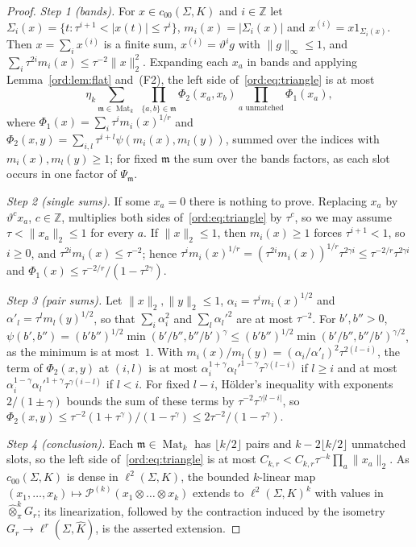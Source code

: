\documentclass[11pt]{amsart}
\theoremstyle{definition}
\theoremstyle{remark}
\numberwithin{equation}{section}
\newcommand{\Z}{\mathbb Z}
\newcommand{\abs}[1]{\lvert #1\rvert}
\newcommand{\norm}[1]{\lVert #1\rVert}
\newcommand{\Kh}{\widehat K}
\theoremstyle{plain}
\theoremstyle{definition}
\theoremstyle{plain}
\newcommand{\cP}{\mathcal P}
\begin{document}
\begin{proof}
\emph{Step 1 (bands).} For $x\in c_{00}(\Sigma,K)$ and $i\in\Z$ let $\Sigma_i(x)=\{t:\tau^{i+1}<\abs{x(t)}\le\tau^i\}$,
$m_i(x)=\abs{\Sigma_i(x)}$ and $x^{(i)}=x1_{\Sigma_i(x)}$. Then $x=\sum_ix^{(i)}$ is a finite sum,
$x^{(i)}=\vartheta^ig$ with $\norm g_\infty\le1$, and $\sum_i\tau^{2i}m_i(x)\le\tau^{-2}\norm x_2^2$. Expanding each $x_a$
in bands and applying Lemma~\ref{ord:lem:flat} and~(F2), the left side of~\eqref{ord:eq:triangle} is at most
\[
 \eta_k\sum_{\mathfrak m\in\operatorname{Mat}_k}\,\prod_{\{a,b\}\in\mathfrak m}\Phi_2(x_a,x_b)\prod_{a\text{ unmatched}}\Phi_1(x_a),
\]
where $\Phi_1(x)=\sum_i\tau^im_i(x)^{1/r}$ and $\Phi_2(x,y)=\sum_{i,l}\tau^{i+l}\psi(m_i(x),m_l(y))$, summed over the
indices with $m_i(x),m_l(y)\ge1$; for fixed $\mathfrak m$ the sum over the bands factors, as each slot occurs in one
factor of $\Psi_{\mathfrak m}$.

\emph{Step 2 (single sums).} If some $x_a=0$ there is nothing to prove. Replacing $x_a$ by $\vartheta^cx_a$, $c\in\Z$,
multiplies both sides of~\eqref{ord:eq:triangle} by $\tau^c$, so we may assume $\tau<\norm{x_a}_2\le1$ for every $a$.
If $\norm x_2\le1$, then $m_i(x)\ge1$ forces $\tau^{i+1}<1$, so $i\ge0$, and $\tau^{2i}m_i(x)\le\tau^{-2}$; hence
$\tau^im_i(x)^{1/r}=(\tau^{2i}m_i(x))^{1/r}\tau^{2\gamma i}\le\tau^{-2/r}\tau^{2\gamma i}$ and
$\Phi_1(x)\le\tau^{-2/r}/(1-\tau^{2\gamma})$.

\emph{Step 3 (pair sums).} Let $\norm x_2,\norm y_2\le1$, $\alpha_i=\tau^im_i(x)^{1/2}$ and $\alpha'_l=\tau^lm_l(y)^{1/2}$,
so that $\sum_i\alpha_i^2$ and $\sum_l\alpha_l'^2$ are at most $\tau^{-2}$. For $b',b''>0$,
$\psi(b',b'')=(b'b'')^{1/2}\min(b'/b'',b''/b')^\gamma\le(b'b'')^{1/2}\min(b'/b'',b''/b')^{\gamma/2}$, as the minimum is
at most~$1$. With $m_i(x)/m_l(y)=(\alpha_i/\alpha'_l)^2\tau^{2(l-i)}$, the term of $\Phi_2(x,y)$ at $(i,l)$ is at most
$\alpha_i^{1+\gamma}\alpha_l'^{1-\gamma}\tau^{\gamma(l-i)}$ if $l\ge i$ and at most
$\alpha_i^{1-\gamma}\alpha_l'^{1+\gamma}\tau^{\gamma(i-l)}$ if $l<i$. For fixed $l-i$, H\"older's inequality with
exponents $2/(1\pm\gamma)$ bounds the sum of these terms by $\tau^{-2}\tau^{\gamma\abs{l-i}}$, so
$\Phi_2(x,y)\le\tau^{-2}(1+\tau^\gamma)/(1-\tau^\gamma)\le2\tau^{-2}/(1-\tau^\gamma)$.

\emph{Step 4 (conclusion).} Each $\mathfrak m\in\operatorname{Mat}_k$ has $\lfloor k/2\rfloor$ pairs and
$k-2\lfloor k/2\rfloor$ unmatched slots, so the left side of~\eqref{ord:eq:triangle} is at most
$C_{k,r}<C_{k,r}\tau^{-k}\prod_a\norm{x_a}_2$. As $c_{00}(\Sigma,K)$ is dense in $\ell^2(\Sigma,K)$, the bounded
$k$\nobreakdash-linear map $(x_1,\dots,x_k)\mapsto\cP^{(k)}(x_1\otimes\dots\otimes x_k)$ extends to $\ell^2(\Sigma,K)^k$
with values in $\widehat\otimes^k_\pi G_r$; its linearization, followed by the contraction induced by the isometry
$G_r\to\ell^r(\Sigma,\Kh)$, is the asserted extension.
\end{proof}
\end{document}
